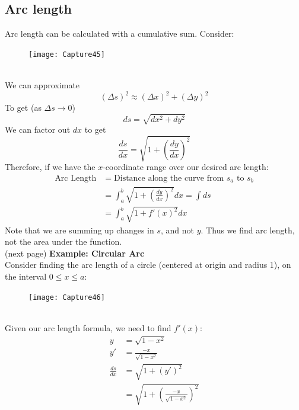\documentclass{report}
\begin{document}
\subsection{Arc length} %
Arc length can be calculated with a cumulative sum. Consider:
\begin{figure}[h]
\texttt{[image: Capture45]}\\
\centering
{}
\end{figure}\\
We can approximate
\begin{equation*}
(\Delta s)^2\approx(\Delta x)^2+(\Delta y)^2
\end{equation*}
To get (as $\Delta s\to0$)
\begin{equation*}
ds=\sqrt{dx^2+dy^2}
\end{equation*}
We can factor out $dx$ to get
\begin{equation*}
\frac{ds}{dx}=\sqrt{1+\left(\frac{dy}{dx}\right)^2}
\end{equation*}
Therefore, if we have the $x$-coordinate range over our desired arc length:
\begin{align*}
\text{Arc Length}&=\text{Distance along the curve from $s_a$ to $s_b$}\\
&=\int_a^b\sqrt{1+\left(\frac{dy}{dx}\right)^2}dx=\int ds\\
&=\int_a^b\sqrt{1+f'(x)^2}dx
\end{align*}
Note that we are summing up changes in $s$, and not $y$. Thus we find arc length, not the area under the function.\\
(next page)
\newpage
\noindent\textbf{Example: Circular Arc}\\
Consider finding the arc length of a circle (centered at origin and radius 1), on 
the interval $0\leq x\leq a$:
\begin{figure}[h]
\texttt{[image: Capture46]}\\
\centering
{}
\end{figure}\\
Given our arc length formula, we need to find $f'(x)$:
\begin{align*}
y&=\sqrt{1-x^2}\\
y'&=\frac{-x}{\sqrt{1-x^2}}\\
\frac{ds}{dx}&=\sqrt{1+(y')^2}\\
&=\sqrt{1+\left(\frac{-x}{\sqrt{1-x^2}}\right)^2}
\end{align*}
\end{document}
